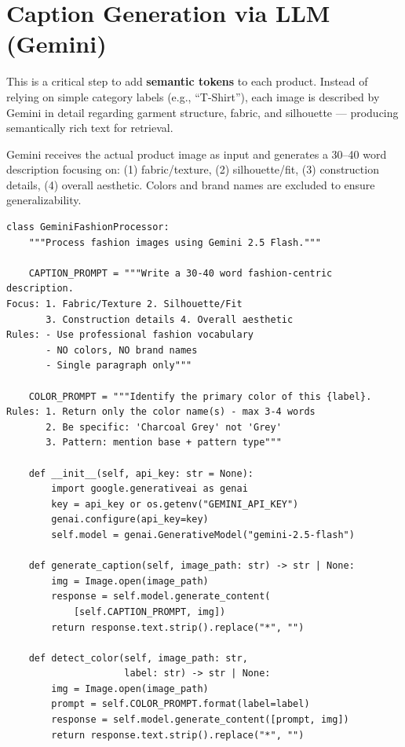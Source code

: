 \documentclass[12pt, twoside]{report}
\begin{document}
\section{Caption Generation via LLM (Gemini)}

This is a critical step to add \textbf{semantic tokens} to each product. Instead of relying on simple category labels (e.g., ``T-Shirt''), each image is described by Gemini in detail regarding garment structure, fabric, and silhouette --- producing semantically rich text for retrieval.

\begin{tcolorbox}[title=Method: Multimodal Caption Generation]
Gemini receives the actual product image as input and generates a 30--40 word description focusing on: (1) fabric/texture, (2) silhouette/fit, (3) construction details, (4) overall aesthetic. Colors and brand names are excluded to ensure generalizability.
\end{tcolorbox}

\begin{lstlisting}[caption={Fashion caption generation via Gemini --- processing\_data.py}]
class GeminiFashionProcessor:
    """Process fashion images using Gemini 2.5 Flash."""

    CAPTION_PROMPT = """Write a 30-40 word fashion-centric description.
Focus: 1. Fabric/Texture 2. Silhouette/Fit
       3. Construction details 4. Overall aesthetic
Rules: - Use professional fashion vocabulary
       - NO colors, NO brand names
       - Single paragraph only"""

    COLOR_PROMPT = """Identify the primary color of this {label}.
Rules: 1. Return only the color name(s) - max 3-4 words
       2. Be specific: 'Charcoal Grey' not 'Grey'
       3. Pattern: mention base + pattern type"""

    def __init__(self, api_key: str = None):
        import google.generativeai as genai
        key = api_key or os.getenv("GEMINI_API_KEY")
        genai.configure(api_key=key)
        self.model = genai.GenerativeModel("gemini-2.5-flash")

    def generate_caption(self, image_path: str) -> str | None:
        img = Image.open(image_path)
        response = self.model.generate_content(
            [self.CAPTION_PROMPT, img])
        return response.text.strip().replace("*", "")

    def detect_color(self, image_path: str,
                     label: str) -> str | None:
        img = Image.open(image_path)
        prompt = self.COLOR_PROMPT.format(label=label)
        response = self.model.generate_content([prompt, img])
        return response.text.strip().replace("*", "")
\end{lstlisting}
\end{document}
